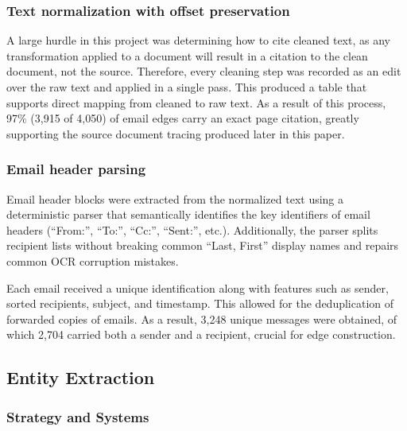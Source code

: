 \documentclass[
  letterpaper,
  DIV=11,
  numbers=noendperiod]{scrartcl}
\begin{document}
\subsubsection{Text normalization with offset
preservation}\label{text-normalization-with-offset-preservation}

A large hurdle in this project was determining how to cite cleaned text,
as any transformation applied to a document will result in a citation to
the clean document, not the source. Therefore, every cleaning step was
recorded as an edit over the raw text and applied in a single pass. This
produced a table that supports direct mapping from cleaned to raw text.
As a result of this process, 97\% (3,915 of 4,050) of email edges carry
an exact page citation, greatly supporting the source document tracing
produced later in this paper.

\subsubsection{Email header parsing}\label{email-header-parsing}

Email header blocks were extracted from the normalized text using a
deterministic parser that semantically identifies the key identifiers of
email headers (``From:'', ``To:'', ``Cc:'', ``Sent:'', etc.).
Additionally, the parser splits recipient lists without breaking common
``Last, First'' display names and repairs common OCR corruption
mistakes.

Each email received a unique identification along with features such as
sender, sorted recipients, subject, and timestamp. This allowed for the
deduplication of forwarded copies of emails. As a result, 3,248 unique
messages were obtained, of which 2,704 carried both a sender and a
recipient, crucial for edge construction.

\subsection{Entity Extraction}\label{entity-extraction}

\subsubsection{Strategy and Systems}\label{strategy-and-systems}
\end{document}
